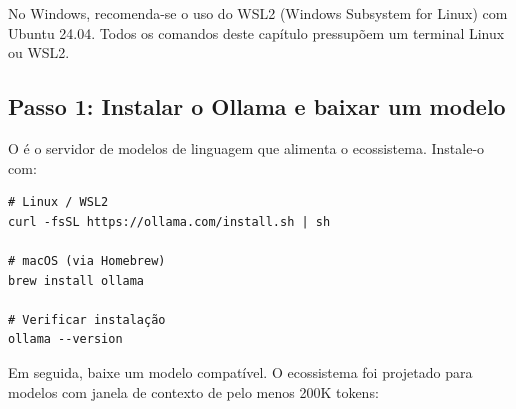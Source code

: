 \begin{table}[htb]
\centering
    \small
\caption{Requisitos de hardware e software}
\label{tab:requisitos}
\end{table}

\begin{observacao}
No Windows, recomenda-se o uso do WSL2 (Windows Subsystem for Linux)
com Ubuntu 24.04. Todos os comandos deste capítulo pressupõem um
terminal Linux ou WSL2.
\end{observacao}

\subsection{Passo 1: Instalar o Ollama e baixar um modelo}
\label{subsec:passo1}

O  é o servidor de modelos de linguagem que alimenta o
ecossistema. Instale-o com:

\begin{lstlisting}[style=bashstyle, caption={Instalação do Ollama},
label={lst:install-ollama}]
# Linux / WSL2
curl -fsSL https://ollama.com/install.sh | sh

# macOS (via Homebrew)
brew install ollama

# Verificar instalação
ollama --version
\end{lstlisting}

Em seguida, baixe um modelo compatível. O ecossistema foi projetado para
modelos com janela de contexto de pelo menos 200K tokens:


